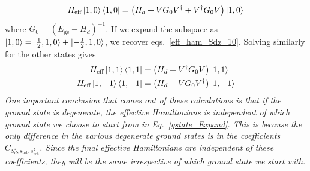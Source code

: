 \documentclass[12pt]{revtex4-2}
\begin{document}
\begin{align}
	\label{eff_ham_10}
	H_\text{eff}\ket{1, 0}\bra{1, 0} = \left(H_d + V G_0 V^\dagger + V^\dagger G_0  V\right) \ket{1, 0}
\end{align}
where \(G_0 = \left(E_\text{gs} - H_d\right)^{-1}\). If we expand the subspace as \(\ket{1,0} = \ket{\frac{1}{2}, 1, 0} + \ket{-\frac{1}{2}, 1, 0}\), we recover eqs.~\ref{eff_ham_Sdz_10}. Solving similarly for the other states gives
\begin{align}
	H_\text{eff}\ket{1,  1}\bra{1,  1} &= \left(H_d + V^\dagger G_0  V\right) \ket{1,  1}\\
	H_\text{eff}\ket{1, - 1}\bra{1, - 1} &= \left(H_d + V G_0 V^\dagger\right) \ket{1, - 1}
\end{align}
\textit{One important conclusion that comes out of these calculations is that if the ground state is degenerate, the effective Hamiltonians is independent of which ground state we choose to start from in Eq.~\ref{gstate_Expand}. This is because the only difference in the various degenerate ground states is in the coefficients \(C_{S_d^z, s_\text{tot},s_\text{tot}^z}\). Since the final effective Hamiltonians are independent of these coefficients, they will be the same irrespective of which ground state we start with.}
\end{document}
